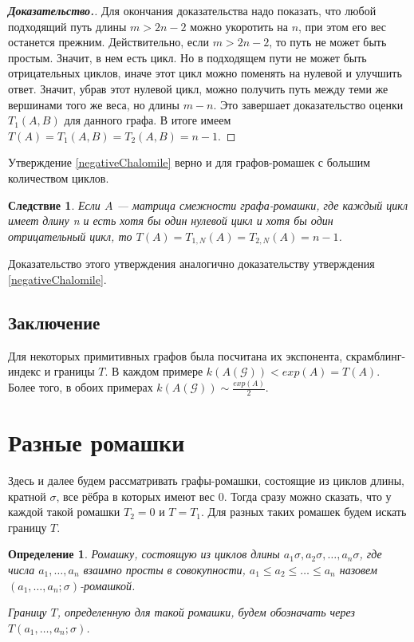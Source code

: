 \documentclass[12pt]{article}
\newtheorem{definition}[theorem]{Определение}
\newtheorem{corollary}[theorem]{Следствие}
\begin{document}
\begin{proof}[\textbf{Доказательство.}]
Для окончания доказательства надо показать, что любой подходящий путь длины $m > 2n - 2$ можно укоротить на $n$, при этом его вес останется прежним. Действительно, если $m > 2n - 2$, то путь не может быть простым. Значит, в нем есть цикл. Но в подходящем пути не может быть отрицательных циклов, иначе этот цикл можно поменять на нулевой и улучшить ответ. Значит, убрав этот нулевой цикл, можно получить путь между теми же вершинами того же веса, но длины $m - n$. Это завершает доказательство оценки $T_1(A, B)$ для данного графа.
В итоге имеем $T(A) = T_1(A, B) = T_2(A, B) = n - 1$.
\end{proof}

Утверждение \ref{negativeChalomile} верно и для графов-ромашек с большим количеством циклов.
\begin{corollary}
Если $A$ --- матрица смежности графа-ромашки, где каждый цикл имеет длину n и есть хотя бы один нулевой цикл и хотя бы один отрицательный цикл, то $T(A) = T_{1, N}(A) = T_{2, N}(A) = n - 1$.
\end{corollary}

Доказательство этого утверждения аналогично доказательству утверждения \ref{negativeChalomile}.

\subsection{Заключение}
Для некоторых примитивных графов была посчитана их экспонента, скрамблинг-индекс и границы $T$. В каждом примере $k(A(\mathcal{G})) < exp(A) = T(A)$. Более того, в обоих примерах $k(A(\mathcal{G})) \sim \frac{exp(A)}{2}$.

\section{Разные ромашки}
Здесь и далее будем рассматривать графы-ромашки, состоящие из циклов длины, кратной $\sigma$, все рёбра в которых имеют вес $0$. Тогда сразу можно сказать, что у каждой такой ромашки $T_2 = 0$ и $T = T_1$. Для разных таких ромашек будем искать границу $T$.
\begin{definition}
Ромашку, состоящую из циклов длины $a_1\sigma, a_2\sigma, \dots, a_n\sigma$, где числа $a_1, \dots, a_n$ взаимно просты в совокупности, $a_1\le a_2 \le \dots \le a_n$ назовем $(a_1, \dots, a_n; \sigma)$-ромашкой.

Границу $T$, определенную для такой ромашки, будем обозначать через $T(a_1, \dots, a_n; \sigma)$.
\end{definition}
\end{document}
